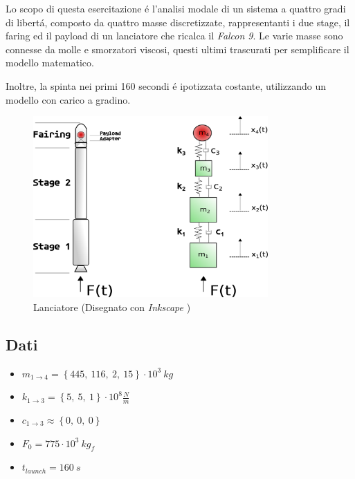 \documentclass{article}
\begin{document}
        Lo scopo di questa esercitazione é l'analisi modale di un sistema a quattro gradi di libertá,
        composto da quattro masse discretizzate, rappresentanti i due stage, il faring ed il payload 
        di un lanciatore che ricalca il \textit{Falcon 9}. Le varie masse sono connesse da molle e smorzatori viscosi, questi
        ultimi trascurati per semplificare il modello matematico.

        Inoltre, la spinta nei primi 160 secondi é ipotizzata costante, utilizzando
        un modello con carico a gradino.

        \begin{figure}[h!]
            \centering
            \label{fig:esercitazione2_drawing}
            \includegraphics[width=0.8\textwidth]{MUL2/Esercitazione2/Esercitazione2.eps}
            \caption{Lanciatore (Disegnato con \textit{Inkscape} \autocite{Inkscape})}
        \end{figure}

        \subsection{Dati\label{Esercitazione_2_dati}}

        \begin{itemize}
            \item $m_{1\rightarrow 4} = \left\{445, \ 116, \ 2, \ 15\right\} \cdot 10^3 \ kg  $
            \item $k_{1\rightarrow 3} = \left\{5, \ 5, \ 1 \right\} \cdot 10^8 \frac{N}{m} $
            \item $c_{1\rightarrow 3} \approx \left\{0, \ 0, \ 0 \right\}$
            \item $F_0 = 775 \cdot 10^3 \ kg_f$
            \item $t_{launch} = 160 \ s$
        \end{itemize}
        \clearpage
\end{document}
